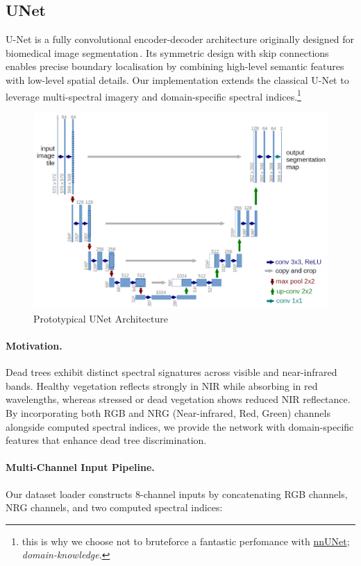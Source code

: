\subsection{UNet}
\label{sec:aj_unet}

U-Net is a fully convolutional encoder-decoder architecture originally designed for biomedical image segmentation\,\cite{b13}. Its symmetric design with skip connections enables precise boundary localisation by combining high-level semantic features with low-level spatial details. Our implementation extends the classical U-Net to leverage multi-spectral imagery and domain-specific spectral indices.\footnote{this is why we choose not to bruteforce a fantastic perfomance with \hyperlink{https://github.com/MIC-DKFZ/nnUNet}{nnUNet}; \emph{domain-knowledge}.}

\begin{figure}
  \centering
  \includegraphics[width=.9\linewidth]{figs/unet-proto.jpg}
  \caption{Prototypical UNet Architecture}
  \label{fig:unet_proto}
\end{figure}

\paragraph{Motivation.}
Dead trees exhibit distinct spectral signatures across visible and near-infrared bands. Healthy vegetation reflects strongly in NIR while absorbing in red wavelengths, whereas stressed or dead vegetation shows reduced NIR reflectance. By incorporating both RGB and NRG (Near-infrared, Red, Green) channels alongside computed spectral indices, we provide the network with domain-specific features that enhance dead tree discrimination.

\paragraph{Multi-Channel Input Pipeline.}
Our dataset loader constructs 8-channel inputs by concatenating RGB channels, NRG channels, and two computed spectral indices:

